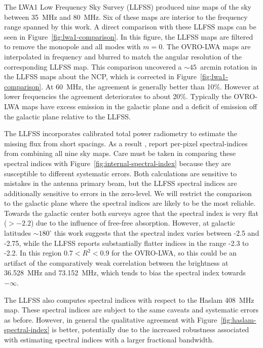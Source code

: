 \documentclass[twocolumn]{aastex61}
\begin{document}
The LWA1 Low Frequency Sky Survey (LLFSS) \citep{2017MNRAS.469.4537D} produced nine maps of the sky
between 35~MHz and 80~MHz. Six of these maps are interior to the frequency range spanned by this
work.  A direct comparison with these LLFSS maps can be seen in Figure~\ref{fig:lwa1-comparison}. In
this figure, the LLFSS maps are filtered to remove the monopole and all modes with $m=0$. The
OVRO-LWA maps are interpolated in frequency and blurred to match the angular resolution of the
corresponding LLFSS map. This comparison uncovered a $\sim45$~arcmin rotation in the LLFSS maps
about the NCP, which is corrected in Figure~\ref{fig:lwa1-comparison}.  At 60~MHz, the agreement is
generally better than 10\%. However at lower frequencies the agreement deteriorates to about 20\%.
Typically the OVRO-LWA maps have excess emission in the galactic plane and a deficit of emission off
the galactic plane relative to the LLFSS.

The LLFSS incorporates calibrated total power radiometry to estimate the missing flux from short
spacings. As a result \citet{2017MNRAS.469.4537D}, report per-pixel spectral-indices from combining
all nine sky maps. Care must be taken in comparing these spectral indices with
Figure~\ref{fig:internal-spectral-index} because they are susceptible to different systematic
errors. Both calculations are sensitive to mistakes in the antenna primary beam, but the LLFSS
spectral indices are additionally sensitive to errors in the zero-level. We will restrict the
comparison to the galactic plane where the spectral indices are likely to be the most reliable.
Towards the galactic center both surveys agree that the spectral index is very flat ($>-2.2$) due to
the influence of free-free absorption.  However, at galactic latitudes $\sim 180^\circ$ this work
suggests that the spectral index varies between -2.5 and -2.75, while the LLFSS reports
substantially flatter indices in the range -2.3 to -2.2. In this region $0.7 < R^2 < 0.9$ for the
OVRO-LWA, so this could be an artifact of the comparatively weak correlation between the brightness
at 36.528~MHz and 73.152~MHz, which tends to bias the spectral index towards $-\infty$.

The LLFSS also computes spectral indices with respect to the Haslam 408~MHz map. These spectral
indices are subject to the same caveats and systematic errors as before. However, in general the
qualitative agreement with Figure~\ref{fig:haslam-spectral-index} is better, potentially due to the
increased robustness associated with estimating spectral indices with a larger fractional bandwidth.
\end{document}
